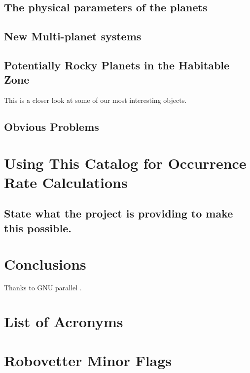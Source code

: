 \documentclass[onecolumn]{aastex6}
\begin{document}
\subsection{The physical parameters of the planets}
\subsection{New Multi-planet systems}
\subsection{Potentially Rocky Planets in the Habitable Zone}
This is a closer look at some of our most interesting objects.
\subsection{Obvious Problems}

\section{Using This Catalog for Occurrence Rate Calculations}
\subsection{State what the project is providing to make this possible.}


\section{Conclusions}

\acknowledgments
Thanks to GNU parallel \citep{Tange2011a}.

\appendix
\section{List of Acronyms}

\section{Robovetter Minor Flags}
%


\end{document}
